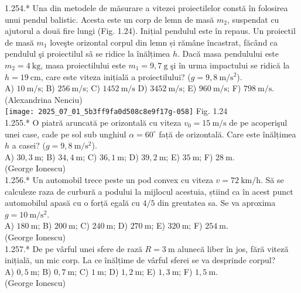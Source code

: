 {1.254.* Una din metodele de măsurare a vitezei proiectilelor constă în folosirea unui pendul balistic. Acesta este un corp de lemn de masă $m_{2}$, suspendat cu ajutorul a două fire lungi (Fig. 1.24). Inițial pendulul este în repaus. Un proiectil de masă $m_{1}$ loveşte orizontal corpul din lemn și rămâne încastrat, făcând ca pendulul şi proiectilul sã se ridice la înălțimea $h$. Dacă masa pendulului este $m_{2}=4 \mathrm{~kg}$, masa proiectilului este $m_{1}=9,7 \mathrm{~g}$ şi în urma impactului se ridică la $h=19 \mathrm{~cm}$, care este viteza inițială a proiectilului? ($g=9,8 \mathrm{~m} / \mathrm{s}^{2}$).\\ A) $10 \mathrm{~m} / \mathrm{s}$; B) $256 \mathrm{~m} / \mathrm{s}$; C) $1452 \mathrm{~m} / \mathrm{s}$ D) $3452 \mathrm{~m} / \mathrm{s}$; E) $960 \mathrm{~m} / \mathrm{s}$; F) $798 \mathrm{~m} / \mathrm{s}$.\\ (Alexandrina Nenciu)\\ \texttt{[image: 2025\_07\_01\_5b3ff9fa0d508c8e9f17g-058]} Fig. 1.24\\

1.255.* O piatră aruncată pe orizontală cu viteza $v_{0}=15 \mathrm{~m} / \mathrm{s}$ de pe acoperişul unei case, cade pe sol sub unghiul $\alpha=60^{\circ}$ față de orizontală. Care este înălțimea $h$ a casei? ($g=9,8 \mathrm{~m} / \mathrm{s}^{2}$).\\ A) $30,3 \mathrm{~m}$; B) $34,4 \mathrm{~m}$; C) $36,1 \mathrm{~m}$; D) $39,2 \mathrm{~m}$; E) $35 \mathrm{~m}$; F) $28 \mathrm{~m}$.\\ (George Ionescu)\\

1.256.* Un automobil trece peste un pod convex cu viteza $v=72 \mathrm{~km} / \mathrm{h}$. Să se calculeze raza de curbură a podului la mijlocul acestuia, știind ca în acest punct automobilul apasă cu o forță egală cu $4 / 5$ din greutatea sa. Se va aproxima $g=10 \mathrm{~m} / \mathrm{s}^{2}$.\\ A) $180 \mathrm{~m}$; B) $200 \mathrm{~m}$; C) $240 \mathrm{~m}$; D) $270 \mathrm{~m}$; E) $320 \mathrm{~m}$; F) $254 \mathrm{~m}$.\\ (George Ionescu)\\

1.257.* De pe vârful unei sfere de rază $R=3 \mathrm{~m}$ alunecă liber în jos, fără viteză inițială, un mic corp. La ce înălțime de vârful sferei se va desprinde corpul?\\ A) $0,5 \mathrm{~m}$; B) $0,7 \mathrm{~m}$; C) $1 \mathrm{~m}$; D) $1,2 \mathrm{~m}$; E) $1,3 \mathrm{~m}$; F) $1,5 \mathrm{~m}$.\\ (George Ionescu)\\

}
